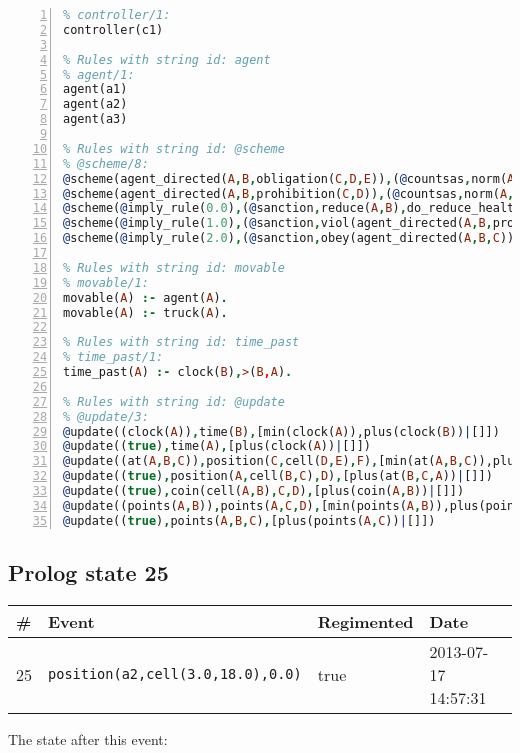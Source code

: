 \documentclass[11pt]{article}\usepackage[utf8]{inputenc}\usepackage{geometry}
\begin{document}
\begin{lstlisting}[language=Prolog, numbers=left]
% Rules with string id: controller
% controller/1:
controller(c1)

% Rules with string id: agent
% agent/1:
agent(a1)
agent(a2)
agent(a3)

% Rules with string id: @scheme
% @scheme/8:
@scheme(agent_directed(A,B,obligation(C,D,E)),(@countsas,norm(A,B,F,obligation(C,D,E)),F),false,(listTrue(C)),(time_past(D)),false,[plus(viol(agent_directed(A,B,obligation(C,D,E))))|[]],[plus(obey(agent_directed(A,B,obligation(C,D,E))))|[]])
@scheme(agent_directed(A,B,prohibition(C,D)),(@countsas,norm(A,B,E,prohibition(C,D)),E),(listTrue(C)),false,(false),false,[plus(viol(agent_directed(A,B,prohibition(C,D))))|[]],[plus(obey(agent_directed(A,B,prohibition(C,D))))|[]])
@scheme(@imply_rule(0.0),(@sanction,reduce(A,B),do_reduce_health(A,B),notifyAgent(A,changed(status))),true,false,false,false,[min(reduce(A,B))|[]],[])
@scheme(@imply_rule(1.0),(@sanction,viol(agent_directed(A,B,prohibition(C,D))),do_sanction(D)),true,false,false,false,[min(viol(agent_directed(A,B,prohibition(C,D))))|[]],[])
@scheme(@imply_rule(2.0),(@sanction,obey(agent_directed(A,B,C))),true,false,false,false,[min(obey(agent_directed(A,B,C)))|[]],[])

% Rules with string id: movable
% movable/1:
movable(A) :- agent(A).
movable(A) :- truck(A).

% Rules with string id: time_past
% time_past/1:
time_past(A) :- clock(B),>(B,A).

% Rules with string id: @update
% @update/3:
@update((clock(A)),time(B),[min(clock(A)),plus(clock(B))|[]])
@update((true),time(A),[plus(clock(A))|[]])
@update((at(A,B,C)),position(C,cell(D,E),F),[min(at(A,B,C)),plus(at(D,E,C))|[]])
@update((true),position(A,cell(B,C),D),[plus(at(B,C,A))|[]])
@update((true),coin(cell(A,B),C,D),[plus(coin(A,B))|[]])
@update((points(A,B)),points(A,C,D),[min(points(A,B)),plus(points(A,D))|[]])
@update((true),points(A,B,C),[plus(points(A,C))|[]])

\end{lstlisting}
\clearpage 
\subsection{Prolog state 25}
\begin{table}[ht]
\centering 
\begin{tabular}{l l l l} 
\textbf{\#} & \textbf{Event} & \textbf{Regimented} & \textbf{Date} \\ [0.5ex] 
\hline
25&\texttt{position(a2,cell(3.0,18.0),0.0)}&true&2013-07-17 14:57:31\\ [1ex] \hline\end{tabular}
\end{table}
The state after this event:
\end{document}
